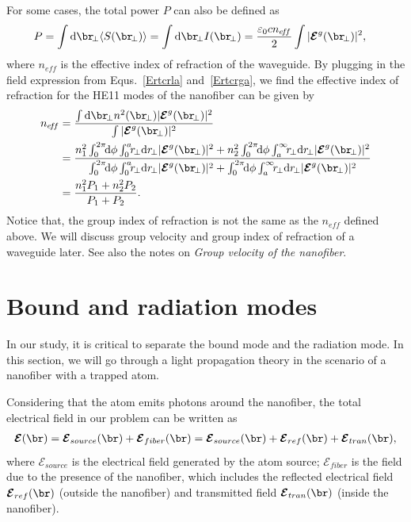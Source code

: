 \documentclass[]{report}
\begin{document}
For some cases, the total power $ P $ can also be defined as
\begin{align}
P &= \int \mathrm{d}\br\!_\perp \langle S(\br\!_\perp)\rangle =\int \mathrm{d} \br\!_\perp I(\br\!_\perp)=\frac{\varepsilon_0 c n_{e\!f\!f}}{2}\int |\boldsymbol{\mathcal{E}}^g(\br\!_\perp)|^2,
\end{align}
where $ n_{e\!f\!f} $ is the effective index of refraction of the waveguide. 
By plugging in the field expression from Equs.~\eqref{Ertcrla} and~\eqref{Ertcrga}, we find the effective index of refraction for the HE11 modes of the nanofiber can be given by
\begin{align}
n_{e\!f\!f} &=\frac{\int \mathrm{d}\br\!_\perp n^2(\br\!_\perp) |\boldsymbol{\mathcal{E}}^g(\br\!_\perp)|^2}{\int |\boldsymbol{\mathcal{E}}^g(\br\!_\perp)|^2}\\
&= \frac{n_1^2\int_0^{2\pi} \!\!\mathrm{d} \phi \int_0^a\!\!r\!_\perp\mathrm{d}r\!_\perp|\boldsymbol{\mathcal{E}}^g(\br\!_\perp)|^2 + n_2^2\int_0^{2\pi}\!\! \mathrm{d} \phi \int_a^\infty\!\!r\!_\perp \mathrm{d}r\!_\perp|\boldsymbol{\mathcal{E}}^g(\br\!_\perp)|^2}
{\int_0^{2\pi} \!\!\mathrm{d} \phi \int_0^a\!\!r\!_\perp\mathrm{d}r\!_\perp|\boldsymbol{\mathcal{E}}^g(\br\!_\perp)|^2 + \int_0^{2\pi}\!\! \mathrm{d} \phi \int_a^\infty\!\!r\!_\perp \mathrm{d}r\!_\perp|\boldsymbol{\mathcal{E}}^g(\br\!_\perp)|^2}\\
&= \frac{n_1^2P_1+n_2^2P_2}{P_1+P_2}.
\end{align}
Notice that, the group index of refraction is not the same as the $ n_{e\!f\!f} $ defined above. We will discuss group velocity and group index of refraction of a waveguide later. See also the notes on \textit{Group velocity of the nanofiber}. 


\section{Bound and radiation modes}\label{sec:boundrad}
In our study, it is critical to separate the bound mode and the radiation mode. In this section, we will 
go through a light propagation theory in the scenario of a nanofiber with a trapped atom. 

Considering that the atom emits photons around the nanofiber, the total electrical field in our problem 
can be written as 
\begin{align}\label{Esrt0}
\boldsymbol{\mathcal{E}}(\br) = \boldsymbol{\mathcal{E}}_{source}(\br) + 
\boldsymbol{\mathcal{E}}_{fiber}(\br)=\boldsymbol{\mathcal{E}}_{source}(\br) + 
\boldsymbol{\mathcal{E}}_{ref}(\br) +\boldsymbol{\mathcal{E}}_{tran}(\br),
\end{align}
where $ \boldsymbol{\mathcal{E}}_{source} $ is the electrical field generated by the atom source;  $ 
\boldsymbol{\mathcal{E}}_{fiber} $ is the field due to the presence of the nanofiber, which includes the 
reflected electrical field $ \boldsymbol{\mathcal{E}}_{ref}(\br) $ (outside the nanofiber) and transmitted field $ 
\boldsymbol{\mathcal{E}}_{tran}(\br) $ (inside the nanofiber). 
\end{document}
